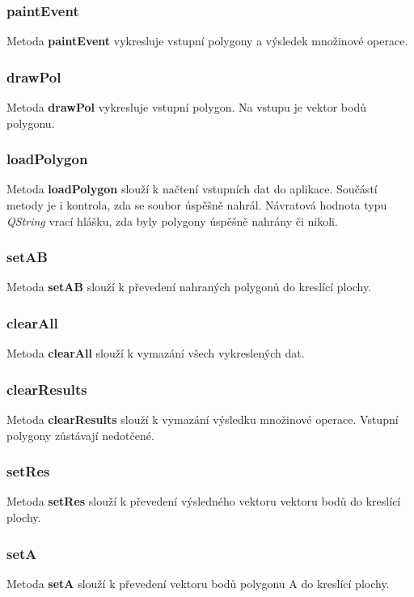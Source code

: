 \documentclass[a4paper, 12pt]{article}
\begin{document}
\subsubsection*{paintEvent}
Metoda \textbf{paintEvent} vykresluje vstupní polygony a výsledek množinové operace.

\subsubsection*{drawPol}
Metoda \textbf{drawPol} vykresluje vstupní polygon. Na vstupu je vektor bodů polygonu. 

\subsubsection*{loadPolygon}
Metoda \textbf{loadPolygon} slouží k načtení vstupních dat do aplikace. Součástí metody je i kontrola, zda se soubor úspěšně nahrál. Návratová hodnota typu \textsl{QString} vrací hlášku, zda byly polygony úspěšně nahrány či nikoli.

\subsubsection*{setAB}
Metoda \textbf{setAB} slouží k převedení nahraných polygonů do kreslící plochy.

\subsubsection*{clearAll}
Metoda \textbf{clearAll} slouží k vymazání všech vykreslených dat.

\subsubsection*{clearResults}
Metoda \textbf{clearResults} slouží k vymazání výsledku množinové operace. Vstupní polygony zůstávají nedotčené.

\subsubsection*{setRes}
Metoda \textbf{setRes} slouží k převedení výsledného vektoru vektoru bodů do kreslící plochy.

\subsubsection*{setA}
Metoda \textbf{setA} slouží k převedení vektoru bodů polygonu A do kreslící plochy.
\end{document}
